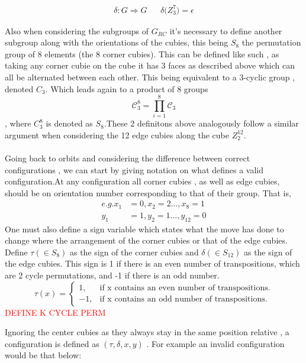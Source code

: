 \documentclass{article}
\begin{document}
\begin{align}
	\delta : G \Rightarrow G && \delta\mathcal({Z}_{3}^{7}) = \epsilon
\end{align}

Also when considering the subgroups of $G_{RC}$ it's necessary to define another subgroup along with the orientations of the cubies, this being $S_{8}$ the permutation group of 8 elements (the 8 corner cubies). This can be defined like such , as taking any corner cubie on the cube it has 3 faces as described above which can all be alternated between each other. This being equivalent to a 3-cyclic group , denoted $C_{3}$. Which leads again to a product of 8 groups \[\mathcal{C}_{3}^8 = \prod_{i=1}^{8}\mathcal{C}_{3}\], where $C_{3}^{8}$ is denoted as $S_{8}$.These 2 definitons above analogously follow a similar argument when considering the 12 edge cubies along the cube $Z^{12}_{2}$.
\paragraph*{}
Going back to orbits and considering the difference between correct configurations , we can start by giving notation on what defines a valid configuration.At any configuration all corner cubies , as well as edge cubies, should be on orientation number corresponding to that of their group. That is,
\begin{align*}
e.g. x_1&=0, x_2=2 ...,x_8=1\\
y_1&=1, y_2=1 ... , y_{12}=0
\end{align*}
One must also define a sign variable which states what the move has done to change where the arrangement of the corner cubies or that of the edge cubies. 
Define $\tau (\in S_{8})$ as the sign of the corner cubies and $\delta (\in  S_{12})$ as the sign of the edge cubies. This sign is 1 if there is an even number of transpositions, which are 2 cycle permutations, and -1 if there is an odd number. 
\begin{equation}
  \tau(x)=\begin{cases}
    1, & \text{if x contains an even number of transpositions}.\\
    -1, & \text{if x contains an odd number of transpositions}.
  \end{cases}
\end{equation}
\textcolor{red}{DEFINE K CYCLE PERM}

Ignoring the center cubies as they always stay in the same position relative , a configuration is defined as \textbf{$(\tau,\delta, x, y)$ }.
For example an invalid configuration would be that below:
\end{document}
